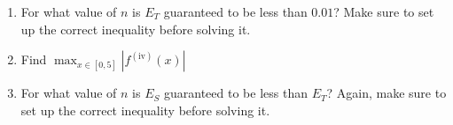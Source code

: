\documentclass[11pt]{article}
\begin{document}
\begin{enumerate}
\begin{enumerate}
            \newpage
            \item For what value of $n$ is $E_T$ guaranteed to be less than $0.01$? Make sure to set up the correct inequality before solving it.\vfill
            \item Find  $\max_{x\in [0,5]} |f^{(\mathrm{iv})}(x)|$\vfill
            \item For what value of $n$ is $E_S$ guaranteed to be less than $E_T$? Again, make sure to set up the correct inequality before solving it.\vfill
        \end{enumerate}
    \end{enumerate}
\end{document}
